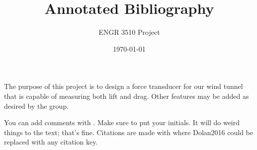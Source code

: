 \documentclass[12pt,letterpaper]{article}
\begin{document}
\title{Annotated Bibliography}
\author{ENGR 3510 Project}
\date{\today}
\maketitle

The purpose of this project is to design a force transducer for our wind tunnel that is capable of measuring both lift and drag. Other features may be added as desired by the group.

You can add comments with . Make sure to put your initials. It will do weird things to the text; that's fine. 
Citations are made with \cite{Dolan2016} where Dolan2016 could be replaced with any citation key. 

\end{document}
